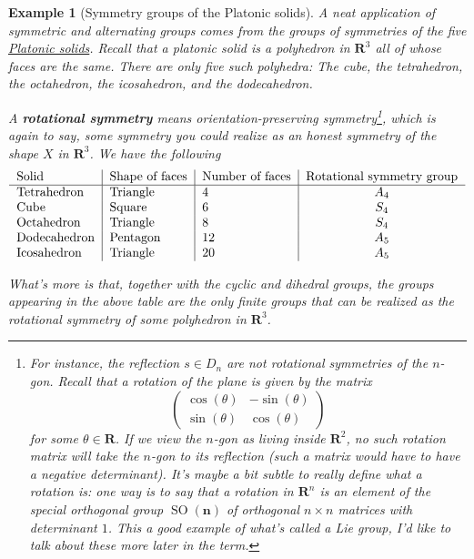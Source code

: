 \documentclass[12pt]{article}
\numberwithin{equation}{subsection}
\theoremstyle{note}
\newtheorem{example}[subsection]{Example}
\begin{document}
\begin{example}[Symmetry groups of the Platonic solids] \label{platonic-solids-ex}
A neat application of symmetric and alternating groups comes from the groups of symmetries of the five \href{https://en.wikipedia.org/wiki/Platonic_solid}{Platonic solids}. Recall that a platonic solid is a polyhedron in $\mathbf{R}^3$ all of whose faces are the same. There are only five such polyhedra: The cube, the tetrahedron, the octahedron, the icosahedron, and the dodecahedron. 

A \textbf{rotational symmetry} means \textit{orientation-preserving symmetry}\footnote{For instance, the reflection $s\in D_n$ are not rotational symmetries of the $n$-gon. Recall that a rotation of the plane is given by the matrix \[\begin{pmatrix} \cos(\theta) & - \sin(\theta) \\ \sin(\theta) & \cos(\theta) \end{pmatrix}\] for some $\theta\in\mathbf{R}$. If we view the $n$-gon as living inside $\mathbf{R}^2$, no such rotation matrix will take the $n$-gon to its reflection (such a matrix would have to have a negative determinant). It's maybe a bit subtle to really define what a rotation is: one way is to say that a rotation in $\mathbf{R}^n$ is an element of the special orthogonal group $\operatorname{SO}(\mathbf{n})$ of orthogonal $n\times n$ matrices with determinant $1$. This a good example of what's called a Lie group, I'd like to talk about these more later in the term.}, which is again to say, some symmetry you could realize as an honest symmetry of the shape $X$ in $\mathbf{R}^3$. We have the following
\[\begin{tabular}{l | l| l | c}
Solid &  Shape of faces & Number of faces &Rotational symmetry group \\ \hline
Tetrahedron & Triangle & 4 & $A_4$ \\
Cube & Square & 6 & $S_4$ \\
Octahedron & Triangle & 8 & $S_4$ \\
Dodecahedron & Pentagon & 12 & $A_5$ \\
Icosahedron & Triangle & 20 & $A_5$\\
\end{tabular}\]

What's more is that, together with the cyclic and dihedral groups, the groups appearing in the above table are the \textit{only} finite groups that can be realized as the rotational symmetry of some polyhedron in $\mathbf{R}^3$. 
\end{example}
\end{document}
